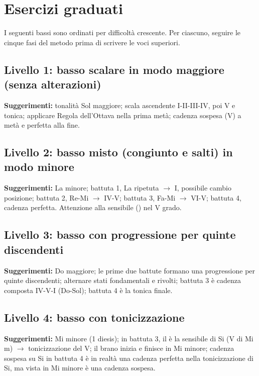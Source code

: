 \section{Esercizi graduati}
\label{sec:esercizi_graduati}

I seguenti bassi sono ordinati per difficoltà crescente. Per ciascuno, seguire le cinque fasi del metodo prima di scrivere le voci superiori.

\subsection{Livello 1: basso scalare in modo maggiore (senza alterazioni)}


\textbf{Suggerimenti:} tonalità Sol maggiore; scala ascendente I-II-III-IV, poi V e tonica; applicare Regola dell'Ottava nella prima metà; cadenza sospesa (V) a metà e perfetta alla fine.

\subsection{Livello 2: basso misto (congiunto e salti) in modo minore}


\textbf{Suggerimenti:} La minore; battuta 1, La ripetuta $\rightarrow$ I, possibile cambio posizione; battuta 2, Re-Mi $\rightarrow$ IV-V; battuta 3, Fa-Mi $\rightarrow$ VI-V; battuta 4, cadenza perfetta. Attenzione alla sensibile (\Soldiesis{}) nel V grado.

\subsection{Livello 3: basso con progressione per quinte discendenti}


\textbf{Suggerimenti:} Do maggiore; le prime due battute formano una progressione per quinte discendenti; alternare stati fondamentali e rivolti; battuta 3 è cadenza composta IV-V-I (Do-Sol); battuta 4 è la tonica finale.

\subsection{Livello 4: basso con tonicizzazione}


\textbf{Suggerimenti:} Mi minore (1 diesis); in battuta 3, il \Ladiesis{} è la sensibile di Si (V di Mi m) $\rightarrow$ tonicizzazione del V; il brano inizia e finisce in Mi minore; cadenza sospesa su Si in battuta 4 è in realtà una cadenza perfetta nella tonicizzazione di Si, ma vista in Mi minore è una cadenza sospesa.

